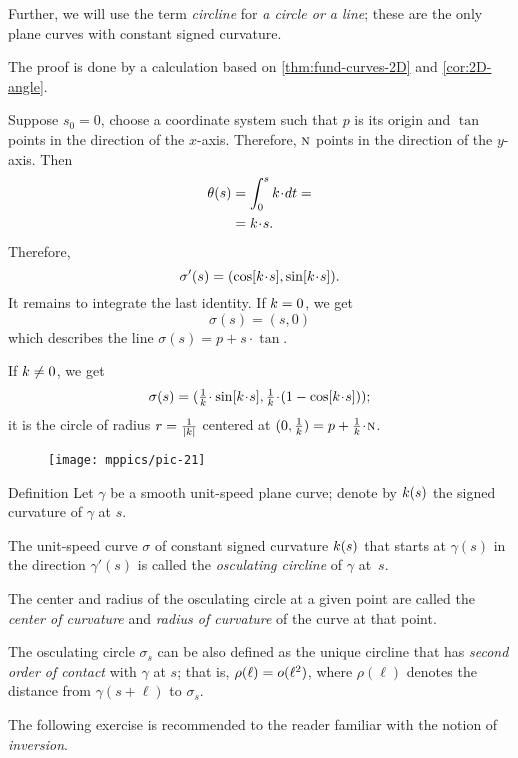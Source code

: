 Further, we will use the term \emph{circline} for {}\emph{a circle or a line};
these are the only plane curves with constant signed curvature.

The proof is done by a calculation based on \ref{thm:fund-curves-2D} and \ref{cor:2D-angle}.

Suppose $s_0=0$, choose a coordinate system such that $p$ is its origin and $\tan$ points in the direction of the $x$-axis.
Therefore, $\text{\sc{n}}$ points in the direction of the $y$-axis.
Then
\begin{align*}\theta(s)&=\int_{0}^s\skur\cdot dt=
\\
&=\skur\cdot s.
\end{align*}
Therefore,
\[\sigma'(s)=(\cos[\skur\cdot s],\sin[\skur\cdot s]).\]
It remains to integrate the last identity.
If $k=0$, we get 
\[\sigma(s)=(s,0)\]
which describes the line $\sigma(s)=p+s\cdot \tan$.

If $k\ne 0$, we get
\[\sigma(s)=(\tfrac1\skur\cdot\sin[\skur\cdot s],
\tfrac1\skur\cdot(1-\cos[\skur\cdot s]));\]
it is the circle of radius $r=\tfrac1{|k|}$ centered at $(0,\tfrac1\skur)=p+\tfrac1\skur\cdot\norm$.
\qeds


\begin{wrapfigure}{r}{31 mm}
\vskip-0mm
\centering
\texttt{[image: mppics/pic-21]}
\vskip0mm
\end{wrapfigure}

\begin{thm}{Definition}
Let $\gamma$ be a smooth unit-speed plane curve;
denote by $k(s)$ the signed curvature of $\gamma$ at $s$.

The unit-speed curve $\sigma$ of constant signed curvature $k(s)$ that starts at $\gamma(s)$ in the direction $\gamma'(s)$ is called the \emph{osculating circline} of $\gamma$ at~$s$.

The center and radius of the osculating circle at a given point are called the \emph{center of curvature} and \emph{radius of curvature} of the curve at that point.
\end{thm}

The osculating circle $\sigma_s$ can be also defined as the unique circline that has \emph{second order of contact} with $\gamma$ at $s$;
that is, $\rho(\ell)\z=o(\ell^2)$, where $\rho(\ell)$ denotes the distance from $\gamma(s+\ell)$ to $\sigma_s$.

The following exercise is recommended to the reader familiar with the notion of \emph{inversion}.

